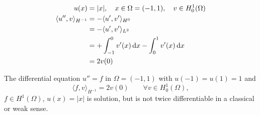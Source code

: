 \begin{example}
	\begin{align*}
	u(x)&=|x|,\quad x \in \Omega = (-1,1), \quad v \in H^1_0(\Omega)\\
	\langle u'',v\rangle_{H^{-1} } 
	&= -\langle u',v'\rangle_{H^0 }\\
	&= -\langle u',v'\rangle_{L^2} \\
	&= +\int^0_{-1} v'(x) \mathop{}\!\mathrm{d} x - \int^1_0 v'(x) \mathop{}\!\mathrm{d} x\\
	&= 2 v(0)
	\end{align*}
	
	The differential equation $u'' = f$ in $\Omega = (-1,1)$ with $u(-1)= u(1) =1$ and
	\begin{equation*}
	\langle f,v\rangle_{H^{-1} } = 2v(0)\qquad \forall v \in H^1_0(\Omega),
	\end{equation*} 
	$f \in H^1(\Omega)$, $u(x)=|x|$ is solution, but is not twice differentiable in a classical or weak sense.
\end{example}


